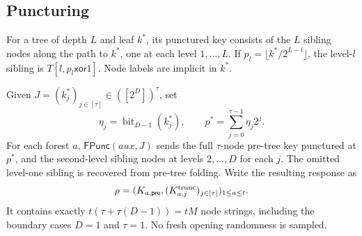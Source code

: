 \documentclass[11pt]{article}
\theoremstyle{plain}
\theoremstyle{definition}
\theoremstyle{remark}
\newcommand{\Punc}{\mathsf{FPunc}}
\begin{document}
\subsection{Puncturing}
For a tree of depth $L$ and leaf $k^*$, its punctured key consists of the
$L$ sibling nodes along the path to $k^*$, one at each level $1,\ldots,L$.
If $p_l=\lfloor k^*/2^{L-l}\rfloor$, the level-$l$ sibling is
$T[l,p_l\mathbin{\mathsf{xor}}1]$. Node labels are implicit in $k^*$.

Given $J=(k_j^*)_{j\in[\tau]}\in([2^D])^\tau$, set
\begin{equation}\label{eq:prechallenge}
 \eta_j=\operatorname{bit}_{D-1}(k_j^*),\qquad
 p^*=\sum_{j=0}^{\tau-1}\eta_j2^j.
\end{equation}
For each forest $a$, $\Punc(aux,J)$ sends the full $\tau$-node
pre-tree key punctured at $p^*$, and the second-level sibling nodes at
levels $2,\ldots,D$ for each $j$.
The omitted level-one sibling is recovered from pre-tree folding.
Write the resulting response as
\[
 \rho=(K_{a,\mathsf{pre}},(K_{a,j}^{\rm trunc})_{j\in[\tau]})_{1\leq a\leq t}.
\]
It contains exactly $t(\tau+\tau(D-1))=tM$ node strings, including the
boundary cases $D=1$ and $\tau=1$. No fresh opening randomness is sampled.
\end{document}
